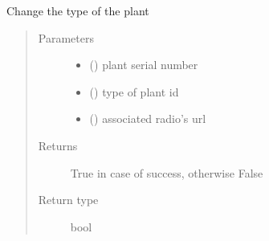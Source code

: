 \documentclass[letterpaper,10pt,english]{sphinxmanual}
\begin{document}

\begin{fulllineitems}
\label{\detokenize{index:controller.utility.change_type}}
Change the type of the plant
\begin{quote}\begin{description}
\item[{Parameters}] \leavevmode\begin{itemize}
\item {} 
 () \textendash{} plant serial number

\item {} 
 () \textendash{} type of plant id

\item {} 
 () \textendash{} associated radio’s url

\end{itemize}

\item[{Returns}] \leavevmode
True in case of success, otherwise False

\item[{Return type}] \leavevmode
bool

\end{description}\end{quote}

\end{fulllineitems}

\end{document}
